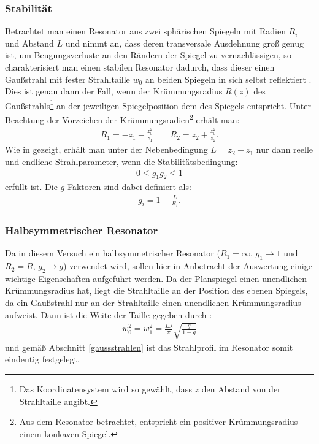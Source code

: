 \documentclass[11pt, a4paper]{article}
\numberwithin{equation}{section}
\begin{document}
\subsubsection{Stabilität}
Betrachtet man einen Resonator aus zwei sphärischen Spiegeln mit Radien $R_i$ und Abstand $L$ und nimmt an, dass deren transversale Ausdehnung groß genug ist, um Beugungsverluste an den Rändern der Spiegel zu vernachlässigen, so charakterisiert man einen stabilen Resonator dadurch, dass dieser einen Gaußstrahl mit fester Strahltaille $w_0$ an beiden Spiegeln in sich selbst reflektiert \cite{siegman}.
Dies ist genau dann der Fall, wenn der Krümmungsradius $R(z)$ des Gaußstrahls\footnote{Das Koordinatensystem wird so gewählt, dass $z$ den Abstand von der Strahltaille angibt.} an der jeweiligen Spiegelposition dem des Spiegels entspricht.
Unter Beachtung der Vorzeichen der Krümmungsradien\footnote{Aus dem Resonator betrachtet, entspricht ein positiver Krümmungsradius einem konkaven Spiegel.} erhält man:
\begin{align}
	R_1 = - z_1 - \frac{z_0^2}{z_1}  \qquad
	R_2 = z_2 + \frac{z_0^2}{z_2} \text{.}
\end{align}
Wie in \cite{siegman} gezeigt, erhält man unter der Nebenbedingung $L = z_2 - z_1$ nur dann reelle und endliche Strahlparameter, wenn die Stabilitätsbedingung:
\begin{align}
	0 \le g_1 g_2 \le 1
\end{align}
erfüllt ist.
Die $g$-Faktoren sind dabei definiert als:
\begin{align}
	g_i = 1 - \frac{L}{R_i} \text{.}
\end{align}

\subsubsection{Halbsymmetrischer Resonator}
\label{ssec:halbsym_res}
Da in diesem Versuch ein halbsymmetrischer Resonator ($R_1 = \infty$, $g_1 \rightarrow 1$ und $R_2 = R$, $g_2 \rightarrow g$) verwendet wird, sollen hier in Anbetracht der Auswertung einige wichtige Eigenschaften aufgeführt werden.
Da der Planspiegel einen unendlichen Krümmungsradius hat, liegt die Strahltaille an der Position des ebenen Spiegels, da ein Gaußstrahl nur an der Strahltaille einen unendlichen Krümmungsradius aufweist.
Dann ist die Weite der Taille gegeben durch \cite{siegman}:
\begin{align}
	w_0^2 = w_1^2 = \frac{L \lambda}{\pi} \sqrt{\frac{g}{1 - g}}
	\label{eq:strahltaille_halbsym}
\end{align}
und gemäß Abschnitt \ref{gaussstrahlen} ist das Strahlprofil im Resonator somit eindeutig festgelegt.
\end{document}

